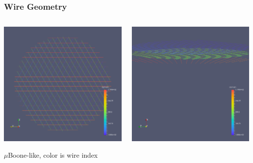 \documentclass[xcolor=dvipsnames]{beamer}
\begin{document}
\begin{frame}
  \frametitle{Wire Geometry}
  \begin{columns}
    \begin{column}{0.5\textwidth}
      \begin{center}
        \includegraphics[width=\textwidth,clip,trim=2cm 1cm 2cm 2cm]{steps/wires1.png}
        
        $\mu$Boone-like, color is wire index
      \end{center}
    \end{column}
    \begin{column}{0.5\textwidth}
      \includegraphics[width=\textwidth,clip,trim=0 22cm 0 2cm]{steps/wires2.png}
      

\end{column}
\end{columns}
\end{frame}
\end{document}
